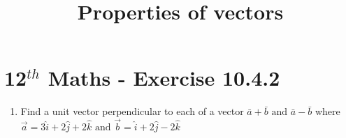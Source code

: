\documentclass[12pt]{article}
\begin{document}
\begin{center}
\title{\textbf{Properties of vectors}}
\date{\vspace{-5ex}} %
\maketitle
\end{center}
\setcounter{page}{1}
\section{12$^{th}$ Maths - Exercise 10.4.2}

\begin{enumerate}
\item Find a unit vector  perpendicular to each of a vector $\bar{a}+\bar{b} \text{ and }\bar{a}-\bar{b}$ where  $\overrightarrow{a}=3\hat{i}+2\hat{j}+2\hat{k}\text{ and }\overrightarrow{b}=\hat{i}+2\hat{j}-2\hat{k}$

\end{enumerate}
\end{document}
